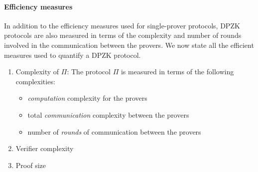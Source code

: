 \paragraph{Efficiency measures}
In addition to the efficiency measures used for single-prover protocols, DPZK protocols are also measured in terms of the complexity and number of rounds involved in the communication between the provers. We now state all the efficient measures used to quantify a DPZK protocol.
\begin{enumerate}
\item Complexity of $\Pi$: The protocol $\Pi$ is measured in terms of the following complexities:
\begin{itemize}
\item \textit{computation} complexity for the provers
\item total \textit{communication} complexity between the provers
\item number of \textit{rounds} of communication between the provers
\end{itemize}
\item Verifier complexity
\item Proof size
\end{enumerate}

